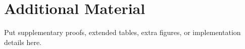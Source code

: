 \appendix
\chapter{Additional Material}

Put supplementary proofs, extended tables, extra figures, or implementation details here.
